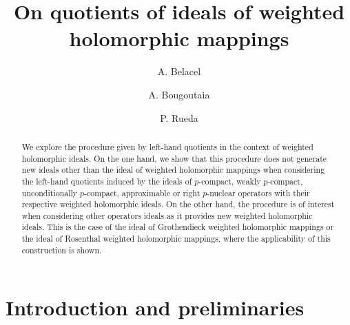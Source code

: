 \documentclass[12pt]{amsart}
\theoremstyle{plain}
\numberwithin{equation}{section}
\begin{document}
\title[On quotients of ideals of weighted holomorphic mappings]{On quotients of
ideals of weighted holomorphic mappings}
\author[A. Belacel]{A. Belacel}
\address[Amar Belacel]{Laboratory of Pure and Applied Mathematics (LPAM),
University of Laghouat, Laghouat, Algeria.}
\author[A. Bougoutaia]{A. Bougoutaia}
\address[Amar Bougoutaia]{Laboratory of Pure and Applied Mathematics (LPAM),
University of Laghouat, Laghouat, Algeria.}
\author[P. Rueda]{P. Rueda}
\address[Pilar Rueda]{Departamento de An\'alisis Matem\'{a}tico, Universitat de Val\`encia, C/ Dr. Moliner 50, 46100  Burjassot (Valencia), Spain}

\begin{abstract}
We explore the procedure given by left-hand quotients in the context  of weighted holomorphic  ideals. On the one hand, we show that this procedure does  not generate new ideals other than the  ideal of weighted holomorphic mappings when considering the left-hand quotients induced by the ideals of  $p$-compact, weakly $p$-compact, unconditionally $p$-compact, approximable  or right $p$-nuclear operators with their respective weighted holomorphic ideals. On the other hand, the procedure is of interest when considering other operators ideals as it provides new weighted holomorphic ideals. This is the case of the ideal of Grothendieck weighted holomorphic mappings or the ideal of Rosenthal weighted holomorphic mappings, where the applicability of this construction is shown.
\end{abstract}

\maketitle

\section{Introduction and preliminaries}
\end{document}
